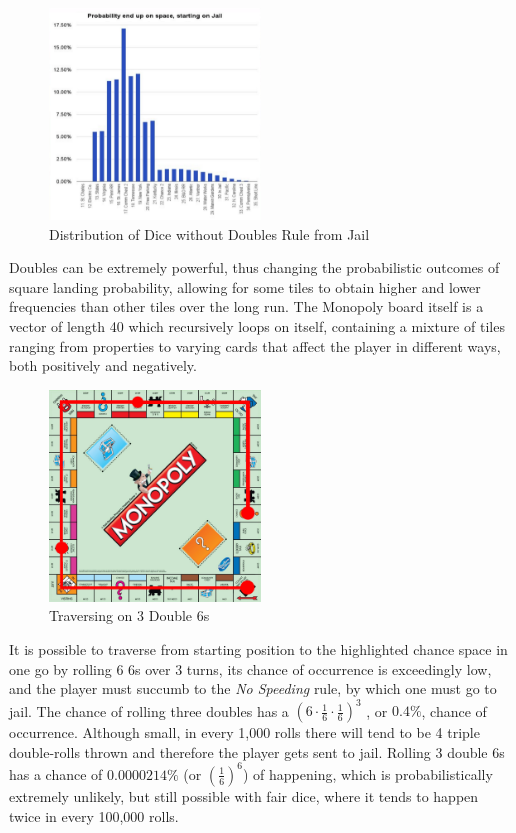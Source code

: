 \documentclass[12pt]{article}
\begin{document}
\begin{figure}[h]
\centering
\includegraphics[width=0.5\textwidth]{incl_doubles_jail.png}
\caption{Distribution of Dice without Doubles Rule from Jail}
\end{figure}
Doubles can be extremely powerful, thus changing the probabilistic outcomes of square landing probability, allowing for some tiles to obtain higher and lower frequencies than other tiles over the long run. The Monopoly board itself is a vector of length 40 which recursively loops on itself, containing a mixture of tiles ranging from properties to varying cards that affect the player in different ways, both positively and negatively. 
\begin{figure}[h]
\centering
\includegraphics[width=0.5\textwidth]{triple_traverse.jpg}
\caption{Traversing on 3 Double 6s}
\end{figure}
It is possible to traverse from starting position to the highlighted chance space in one go by rolling 6 6s over 3 turns, its chance of occurrence is exceedingly low, and the player must succumb to the \emph{No Speeding} rule, by which one must go to jail. The chance of rolling three doubles has a $\left(6 \cdot \frac{1}{6} \cdot \frac{1}{6}\right)^3$ , or $0.4\%$, chance of occurrence. Although small, in every 1,000 rolls there will tend to be 4 triple double-rolls thrown and therefore the player gets sent to jail. Rolling 3 double 6s has a chance of $0.0000214\%$ (or $\left(\frac{1}{6}\right)^{6}$) of happening, which is probabilistically extremely unlikely, but still possible with fair dice, where it tends to happen twice in every 100,000 rolls.
\end{document}
